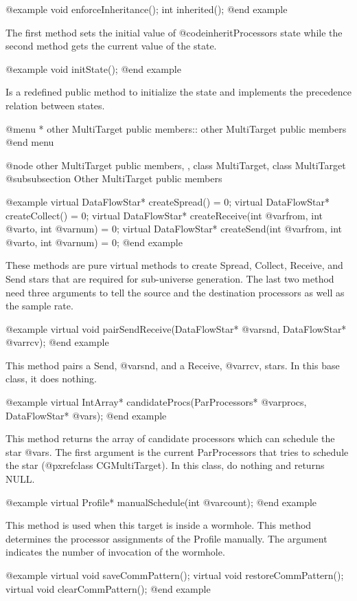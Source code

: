 @example
void enforceInheritance();
int inherited();
@end example

The first method sets the initial value of @code{inheritProcessors} state
while the second method gets the current value of the state.

@example
void initState();
@end example

Is a redefined public method to initialize the state and implements
the precedence relation between states.

@menu
* other MultiTarget public members::	other MultiTarget public members
@end menu

@node other MultiTarget public members, , class MultiTarget, class MultiTarget
@subsubsection Other MultiTarget public members

@example
virtual DataFlowStar* createSpread() = 0;
virtual DataFlowStar* createCollect() = 0;
virtual DataFlowStar* createReceive(int @var{from}, int @var{to}, int @var{num}) = 0;
virtual DataFlowStar* createSend(int @var{from}, int @var{to}, int @var{num}) = 0;
@end example

These methods are pure virtual methods to create Spread, Collect, Receive, and
Send stars that are required for sub-universe generation. The last two method
need three arguments to tell the source and the destination processors as well
as the sample rate.

@example
virtual void pairSendReceive(DataFlowStar* @var{snd}, DataFlowStar* @var{rcv});
@end example

This method pairs a Send, @var{snd}, and a Receive, @var{rcv}, stars. In this
base class, it does nothing.

@example
virtual IntArray* candidateProcs(ParProcessors* @var{procs}, DataFlowStar* @var{s});
@end example

This method returns the array of candidate processors which can schedule
the star @var{s}. The first argument is the current ParProcessors that tries to
schedule the star (@pxref{class CGMultiTarget}). In this class, do
nothing and returns NULL.

@example
virtual Profile* manualSchedule(int @var{count});
@end example

This method is used when this target is inside a wormhole. This method
determines the processor assignments of the Profile manually. The argument
indicates the number of invocation of the wormhole.

@example
virtual void saveCommPattern();
virtual void restoreCommPattern();
virtual void clearCommPattern();
@end example

